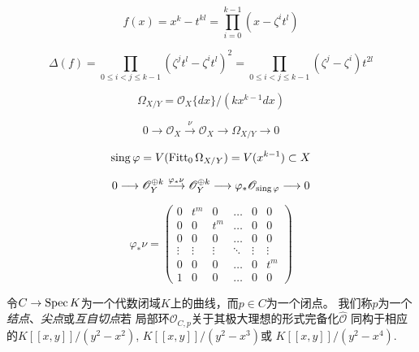 \begin{exa}
\nottran


\[
    f(x)=x^k-t^{k l}=\prod_{i=0}^{k-1}(x-\zeta^i t^l)
\]

\[
    \Delta(f)=\prod_{0 \leq i<j \leq k-1}(\zeta^j t^l-\zeta^i t^l)^2=\prod_{0 \leq i<j \leq k-1}(\zeta^j-\zeta^i) t^{2 l}
\]


\end{exa}

\[
    \Omega_{X / Y}=\mathscr{O}_X\{d x\} /\left(k x^{k-1} d x\right)
\]

\[
    0 \longrightarrow \mathscr{O}_X \stackrel{\nu}{\longrightarrow} \mathscr{O}_X \longrightarrow \Omega_{X / Y} \longrightarrow 0
\]

\[
    \operatorname{sing}\varphi=V(\operatorname{Fitt}_0 \Omega_{X/Y})=V(x^{k-1})\subset X
\]

\[
    0 \longrightarrow \mathscr{O}_Y^{\oplus k} \stackrel{\varphi_* \nu}{\longrightarrow} \mathscr{O}_Y^{\oplus k} \longrightarrow \varphi_* \mathscr{O}_{\operatorname{sing} \varphi} \longrightarrow 0
\]


\[
    \varphi_* \nu=\begin{pmatrix}
        0 & t^m & 0 & \ldots & 0 & 0 \\
        0 & 0 & t^m & \ldots & 0 & 0 \\
        0 & 0 & 0 & \ldots & 0 & 0 \\
        \vdots & \vdots & \vdots & \ddots & \vdots & \vdots \\
        0 & 0 & 0 & \ldots & 0 & t^m \\
        1 & 0 & 0 & \ldots & 0 & 0
    \end{pmatrix}
\]


\begin{defi}\label{defi:5.31}
    令$C\to \operatorname{Spec} K$为一个代数闭域$K$上的曲线，而$p\in C$为一个闭点。
    我们称$p$为一个\textit{结点}、\textit{尖点}或\textit{互自切点}若
    局部环$\mathscr O_{C,p}$关于其极大理想的形式完备化$\hat{\mathscr O}$
    同构于相应的$K[\![x,y]\!]/(y^2-x^2)$, $K[\![x,y]\!]/(y^2-x^3)$或
    $K[\![x,y]\!]/(y^2-x^4)$.
\end{defi}